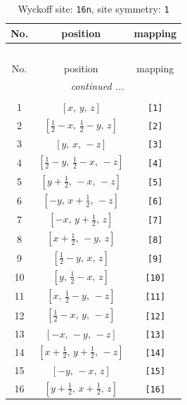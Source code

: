 \documentclass[fleqn,8pt]{jsarticle}
\begin{document}
\begin{longtable}{ccc}
\caption{Wyckoff site: {\tt 16n}, site symmetry: {\tt 1}}
 \\
 \hline \hline
No. & position & mapping \\ \hline \endfirsthead

\multicolumn{2}{l}{\tablename\ \thetable{}} \\
 \hline \hline
No. & position & mapping \\ \hline \endhead

 \hline \hline
\multicolumn{2}{r}{\footnotesize\it continued ...} \\ \endfoot

 \hline \hline
\multicolumn{2}{r}{} \\ \endlastfoot

1 & $\left[ x,\, y,\, z \right]$ & {\tt [1]} \\ \hline
2 & $\left[ \frac{1}{2} - x,\, \frac{1}{2} - y,\, z \right]$ & {\tt [2]} \\ \hline
3 & $\left[ y,\, x,\, - z \right]$ & {\tt [3]} \\ \hline
4 & $\left[ \frac{1}{2} - y,\, \frac{1}{2} - x,\, - z \right]$ & {\tt [4]} \\ \hline
5 & $\left[ y + \frac{1}{2},\, - x,\, - z \right]$ & {\tt [5]} \\ \hline
6 & $\left[ - y,\, x + \frac{1}{2},\, - z \right]$ & {\tt [6]} \\ \hline
7 & $\left[ - x,\, y + \frac{1}{2},\, z \right]$ & {\tt [7]} \\ \hline
8 & $\left[ x + \frac{1}{2},\, - y,\, z \right]$ & {\tt [8]} \\ \hline
9 & $\left[ \frac{1}{2} - y,\, x,\, z \right]$ & {\tt [9]} \\ \hline
10 & $\left[ y,\, \frac{1}{2} - x,\, z \right]$ & {\tt [10]} \\ \hline
11 & $\left[ x,\, \frac{1}{2} - y,\, - z \right]$ & {\tt [11]} \\ \hline
12 & $\left[ \frac{1}{2} - x,\, y,\, - z \right]$ & {\tt [12]} \\ \hline
13 & $\left[ - x,\, - y,\, - z \right]$ & {\tt [13]} \\ \hline
14 & $\left[ x + \frac{1}{2},\, y + \frac{1}{2},\, - z \right]$ & {\tt [14]} \\ \hline
15 & $\left[ - y,\, - x,\, z \right]$ & {\tt [15]} \\ \hline
16 & $\left[ y + \frac{1}{2},\, x + \frac{1}{2},\, z \right]$ & {\tt [16]} \\
\end{longtable}
\end{document}
